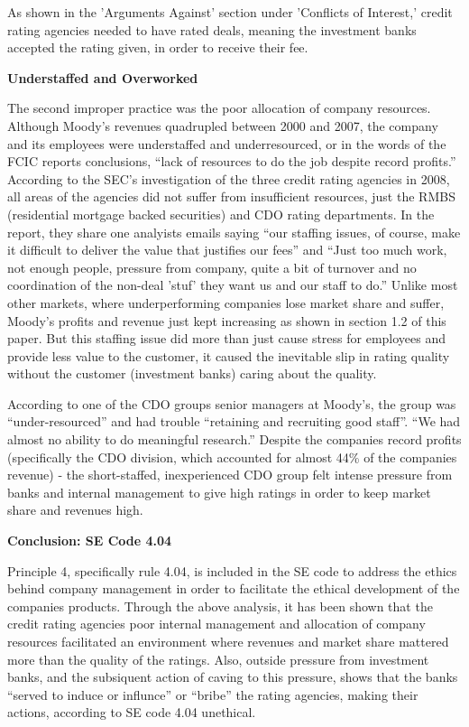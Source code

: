 \documentclass[11pt]{article}
\begin{document}
\begin{multicols}{2}
As shown in the 'Arguments Against' section under 'Conflicts of Interest,' credit rating agencies needed to have rated deals, meaning the investment banks accepted the rating given, in order to receive their fee. \cite[p. 210]{govtReport} 

\textbf{Understaffed and Overworked}

The second improper practice was the poor allocation of company resources.  Although Moody's revenues quadrupled between 2000 and 2007, the company and its employees were understaffed and underresourced, or in the words of the FCIC reports conclusions, ``lack of resources to do the job despite record profits.''\cite[p. xxv]{govtReport}  According to the SEC's investigation of the three credit rating agencies in 2008, all areas of the agencies did not suffer from insufficient resources, just the RMBS (residential mortgage backed securities) and CDO rating departments. \cite{secCRAreport}  In the report, they share one analyists emails saying ``our staffing issues, of course, make it difficult to deliver the value that justifies our fees'' and ``Just too much work, not enough people, pressure from company, quite a bit of turnover and no coordination of the non-deal 'stuf' they want us and our staff to do.'' \cite{secCRAreport}  Unlike most other markets, where underperforming companies lose market share and suffer, Moody's profits and revenue just kept increasing as shown in section 1.2 of this paper.  But this staffing issue did more than just cause stress for employees and provide less value to the customer, it caused the inevitable slip in rating quality without the customer (investment banks) caring about the quality.   

According to one of the CDO groups senior managers at Moody's, the group was ``under-resourced'' and had trouble ``retaining and recruiting good staff''. ``We had almost no ability to do meaningful research.'' \cite[p. 149]{govtReport}  Despite the companies record profits (specifically the CDO division, which accounted for almost 44\% of the companies revenue) - the short-staffed, inexperienced CDO group felt intense pressure from banks and internal management to give high ratings in order to keep market share and revenues high. \cite[pg. 149-150]{govtReport}

\textbf{Conclusion: SE Code 4.04}

Principle 4, specifically rule 4.04, is included in the SE code to address the ethics behind company management in order to facilitate the ethical development of the companies products.  Through the above analysis, it has been shown that the credit rating agencies poor internal management and allocation of company resources facilitated an environment where revenues and market share mattered more than the quality of the ratings.  Also, outside pressure from investment banks, and the subsiquent action of caving to this pressure, shows that the banks ``served to induce or influnce'' or ``bribe'' the rating agencies, making their actions, according to SE code 4.04 unethical.


\end{multicols}
\end{document}
